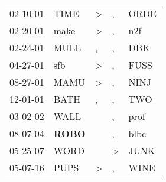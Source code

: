 \begin{supertabular}{p{0.07\textwidth}p{0.06\textwidth}p{0.02\textwidth}p{0.02\textwidth}p{0.06\textwidth}}
 02-10-01\textsuperscript{} &           TIME\textsuperscript{} &  \textgreater &             , &  ORDE\textsuperscript{} \\
 02-20-01\textsuperscript{} &           make\textsuperscript{} &  \textgreater &             , &   n2f\textsuperscript{} \\
 02-24-01\textsuperscript{} &           MULL\textsuperscript{} &             , &             , &   DBK\textsuperscript{} \\
 04-27-01\textsuperscript{} &            sfb\textsuperscript{} &  \textgreater &             , &  FUSS\textsuperscript{} \\
 08-27-01\textsuperscript{} &           MAMU\textsuperscript{} &  \textgreater &             , &  NINJ\textsuperscript{} \\
 12-01-01\textsuperscript{} &           BATH\textsuperscript{} &             , &             , &   TWO\textsuperscript{} \\
 03-02-02\textsuperscript{} &           WALL\textsuperscript{} &               &             , &  prof\textsuperscript{} \\
 08-07-04\textsuperscript{} &  \textbf{ROBO\textsuperscript{}} &               &             , &  blbc\textsuperscript{} \\
 05-25-07\textsuperscript{} &           WORD\textsuperscript{} &               &  \textgreater &  JUNK\textsuperscript{} \\
 05-07-16\textsuperscript{} &           PUPS\textsuperscript{} &  \textgreater &             , &  WINE\textsuperscript{} \\
\end{supertabular}
